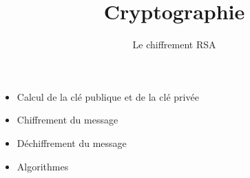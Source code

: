 



\newcommand{\Python}{\texttt{Python}}
\renewcommand{\evidence}[1]{{\color{blue}\textbf{#1}}}

\usepackage{textcomp}

\usepackage{listings}



\newcommand{\codeinline}[1]{\lstinline!#1!}



\newcommand{\prive}[1]{{\color{coul_prive} #1}}
\newcommand{\public}[1]{{\color{coul_public} #1}}


\newenvironment{exempleun}{%
   \setbeamercolor{block title}{fg=structure,bg=structure!40}
   \setbeamercolor{block body}{fg=black,bg=structure!10}
   \begin{block}{\hfill{\small \color{black}{\bf Exemple facile}}}
}{%
   \end{block}%
}

\newenvironment{exempledeux}{%
   \setbeamercolor{block title}{fg=structure,bg=structure!60}
   \setbeamercolor{block body}{fg=black,bg=structure!20}
   \begin{block}{\hfill{\small \color{black}{\bf Exemple dur}}}
}{%
   \end{block}%
}
 





\title{{\bf Cryptographie}}
\subtitle{Le chiffrement RSA}

\begin{frame}
  
  \debutmontitre

  \pause

{\footnotesize
\hfill
{}
\begin{minipage}{0.6\textwidth}
  \begin{itemize}
    \item<3-> Calcul de la clé publique et de la clé privée
    \item<4-> Chiffrement du message
    \item<5-> Déchiffrement du message
    \item<6-> Algorithmes
  \end{itemize}
\end{minipage}
}

\end{frame}

